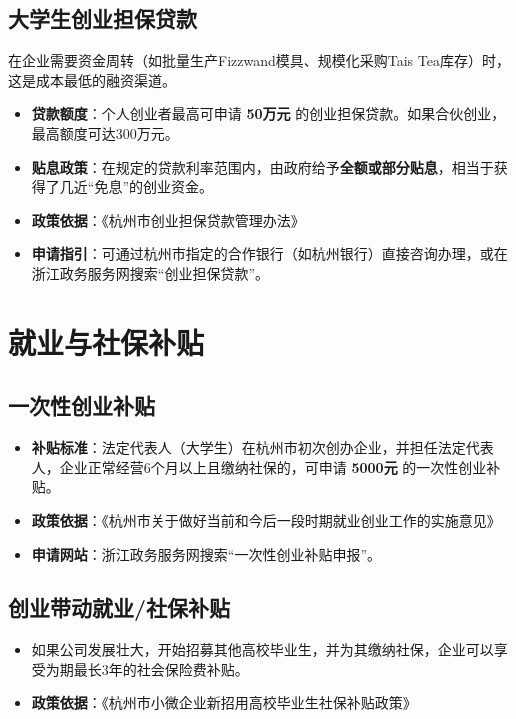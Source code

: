 \documentclass[a4paper, 12pt]{ctexart}
\begin{document}
\subsection{大学生创业担保贷款}
在企业需要资金周转（如批量生产Fizzwand模具、规模化采购Tais Tea库存）时，这是成本最低的融资渠道。
\begin{itemize}
    \item \textbf{贷款额度}：个人创业者最高可申请 \textbf{50万元} 的创业担保贷款。如果合伙创业，最高额度可达300万元。
    \item \textbf{贴息政策}：在规定的贷款利率范围内，由政府给予\textbf{全额或部分贴息}，相当于获得了几近“免息”的创业资金。
    \item \textbf{政策依据}：《杭州市创业担保贷款管理办法》
    \item \textbf{申请指引}：可通过杭州市指定的合作银行（如杭州银行）直接咨询办理，或在浙江政务服务网搜索“创业担保贷款”。
\end{itemize}

\section{就业与社保补贴}

\subsection{一次性创业补贴}
\begin{itemize}
    \item \textbf{补贴标准}：法定代表人（大学生）在杭州市初次创办企业，并担任法定代表人，企业正常经营6个月以上且缴纳社保的，可申请 \textbf{5000元} 的一次性创业补贴。
    \item \textbf{政策依据}：《杭州市关于做好当前和今后一段时期就业创业工作的实施意见》
    \item \textbf{申请网站}：浙江政务服务网搜索“一次性创业补贴申报”。
\end{itemize}

\subsection{创业带动就业/社保补贴}
\begin{itemize}
    \item 如果公司发展壮大，开始招募其他高校毕业生，并为其缴纳社保，企业可以享受为期最长3年的社会保险费补贴。
    \item \textbf{政策依据}：《杭州市小微企业新招用高校毕业生社保补贴政策》
\end{itemize}
\end{document}
